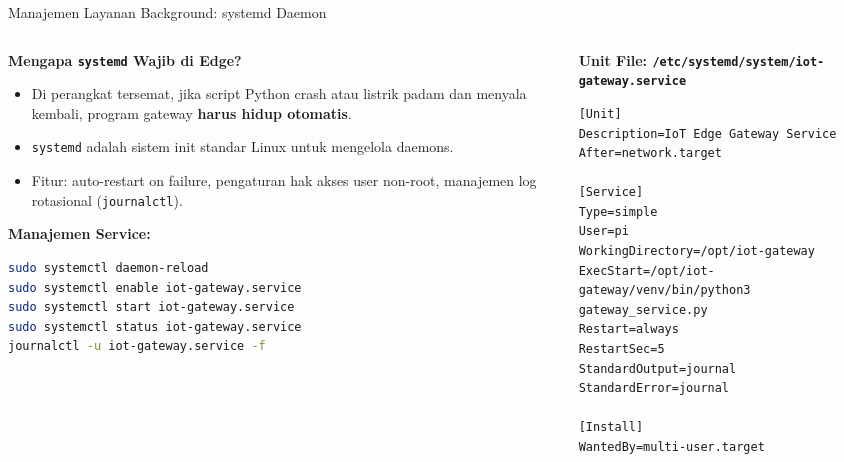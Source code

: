 \documentclass[aspectratio=169,10pt]{beamer}
\begin{document}
\begin{frame}[fragile]{Manajemen Layanan Background: systemd Daemon}
    \begin{columns}[T]
        \begin{column}{0.48\textwidth}
            \textbf{Mengapa \texttt{systemd} Wajib di Edge?}
            \begin{itemize}
                \item Di perangkat tersemat, jika script Python crash atau listrik padam dan menyala kembali, program gateway \textbf{harus hidup otomatis}.
                \item \texttt{systemd} adalah sistem init standar Linux untuk mengelola daemons.
                \item Fitur: auto-restart on failure, pengaturan hak akses user non-root, manajemen log rotasional (\texttt{journalctl}).
            \end{itemize}
            \vspace{2pt}
            \textbf{Manajemen Service:}
            \begin{lstlisting}[style=slidecode, language=bash]
sudo systemctl daemon-reload
sudo systemctl enable iot-gateway.service
sudo systemctl start iot-gateway.service
sudo systemctl status iot-gateway.service
journalctl -u iot-gateway.service -f
            \end{lstlisting}
        \end{column}
        \begin{column}{0.50\textwidth}
            \textbf{Unit File: \texttt{/etc/systemd/system/iot-gateway.service}}
            \begin{lstlisting}[style=slidecode]
[Unit]
Description=IoT Edge Gateway Service
After=network.target

[Service]
Type=simple
User=pi
WorkingDirectory=/opt/iot-gateway
ExecStart=/opt/iot-gateway/venv/bin/python3 gateway_service.py
Restart=always
RestartSec=5
StandardOutput=journal
StandardError=journal

[Install]
WantedBy=multi-user.target
            \end{lstlisting}
        \end{column}
    \end{columns}
\end{frame}
\end{document}
